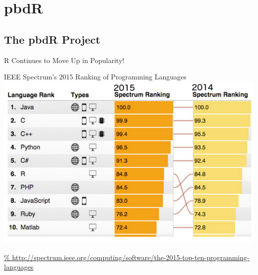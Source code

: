 \section{pbdR}
\makesubcontentsslides

\subsection{The pbdR Project}
\makesubcontentsslidessec

\begin{frame}{R Continues to Move Up in Popularity!}
\vspace{-2em}
  \begin{center}
    IEEE Spectrum's 2015 Ranking of Programming Languages\\[1ex]
    \includegraphics[scale=.45]{../common/pics/IEEE_Spectrum_Rank.png}
  \end{center}
  \vspace{-3em}
 {\scriptsize
\url{%
http://spectrum.ieee.org/computing/software/the-2015-top-ten-programming-languages
}}
\end{frame}

